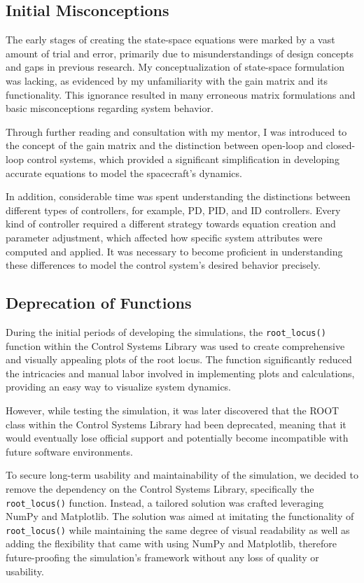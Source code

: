 \documentclass{ifacconf}
\begin{document}
\subsection{Initial Misconceptions}
The early stages of creating the state-space equations were marked by a vast amount of trial and error, primarily due to misunderstandings of design concepts and gaps in previous research. My conceptualization of state-space formulation was lacking, as evidenced by my unfamiliarity with the gain matrix and its functionality. This ignorance resulted in many erroneous matrix formulations and basic misconceptions regarding system behavior.

Through further reading and consultation with my mentor, I was introduced to the concept of the gain matrix and the distinction between open-loop and closed-loop control systems, which provided a significant simplification in developing accurate equations to model the spacecraft's dynamics.

In addition, considerable time was spent understanding the distinctions between different types of controllers, for example, PD, PID, and ID controllers. Every kind of controller required a different strategy towards equation creation and parameter adjustment, which affected how specific system attributes were computed and applied. It was necessary to become proficient in understanding these differences to model the control system's desired behavior precisely.

\subsection{Deprecation of Functions}
During the initial periods of developing the simulations, the \verb|root_locus()| function within the Control Systems Library was used to create comprehensive and visually appealing plots of the root locus. The function significantly reduced the intricacies and manual labor involved in implementing plots and calculations, providing an easy way to visualize system dynamics.

However, while testing the simulation, it was later discovered that the ROOT class within the Control Systems Library had been deprecated, meaning that it would eventually lose official support and potentially become incompatible with future software environments.

To secure long-term usability and maintainability of the simulation, we decided to remove the dependency on the Control Systems Library, specifically the \verb|root_locus()| function. Instead, a tailored solution was crafted leveraging NumPy and Matplotlib. The solution was aimed at imitating the functionality of \verb|root_locus()| while maintaining the same degree of visual readability as well as adding the flexibility that came with using NumPy and Matplotlib, therefore future-proofing the simulation's framework without any loss of quality or usability.
\end{document}
